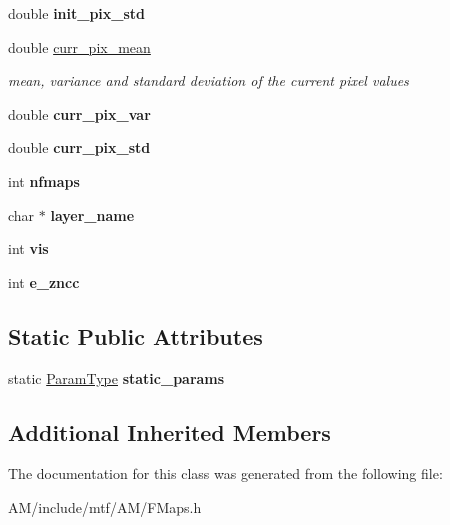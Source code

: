 \begin{DoxyCompactItemize}
\item 
\hypertarget{classFMaps_a4c470ad0517b859f1e08b237a8402a72}{double {\bfseries init\-\_\-pix\-\_\-std}}\label{classFMaps_a4c470ad0517b859f1e08b237a8402a72}

\item 
\hypertarget{classFMaps_adc41982dd716cd062e02074473944196}{double \hyperlink{classFMaps_adc41982dd716cd062e02074473944196}{curr\-\_\-pix\-\_\-mean}}\label{classFMaps_adc41982dd716cd062e02074473944196}

\begin{DoxyCompactList}\small\item\em mean, variance and standard deviation of the current pixel values \end{DoxyCompactList}\item 
\hypertarget{classFMaps_a6a6657178dce1776e0a46d93ff906e98}{double {\bfseries curr\-\_\-pix\-\_\-var}}\label{classFMaps_a6a6657178dce1776e0a46d93ff906e98}

\item 
\hypertarget{classFMaps_a80fc54b3c9604b6c5fd4a3f088961d7f}{double {\bfseries curr\-\_\-pix\-\_\-std}}\label{classFMaps_a80fc54b3c9604b6c5fd4a3f088961d7f}

\item 
\hypertarget{classFMaps_a84ebd30954b0e7a001c3eb5bd2b980aa}{int {\bfseries nfmaps}}\label{classFMaps_a84ebd30954b0e7a001c3eb5bd2b980aa}

\item 
\hypertarget{classFMaps_a4515435f6681cbf800cc6fc347dde8f0}{char $\ast$ {\bfseries layer\-\_\-name}}\label{classFMaps_a4515435f6681cbf800cc6fc347dde8f0}

\item 
\hypertarget{classFMaps_afb2805b98c7e5f7d6d1d2887fca7d0b3}{int {\bfseries vis}}\label{classFMaps_afb2805b98c7e5f7d6d1d2887fca7d0b3}

\item 
\hypertarget{classFMaps_adea04d75ab3dd06d4c3babed473805c3}{int {\bfseries e\-\_\-zncc}}\label{classFMaps_adea04d75ab3dd06d4c3babed473805c3}

\end{DoxyCompactItemize}
\subsection*{Static Public Attributes}
\begin{DoxyCompactItemize}
\item 
\hypertarget{classFMaps_aaab0422bb392800bea1572e36fd63313}{static \hyperlink{structFMapsParams}{Param\-Type} {\bfseries static\-\_\-params}}\label{classFMaps_aaab0422bb392800bea1572e36fd63313}

\end{DoxyCompactItemize}
\subsection*{Additional Inherited Members}


The documentation for this class was generated from the following file\-:\begin{DoxyCompactItemize}
\item 
A\-M/include/mtf/\-A\-M/F\-Maps.\-h\end{DoxyCompactItemize}
